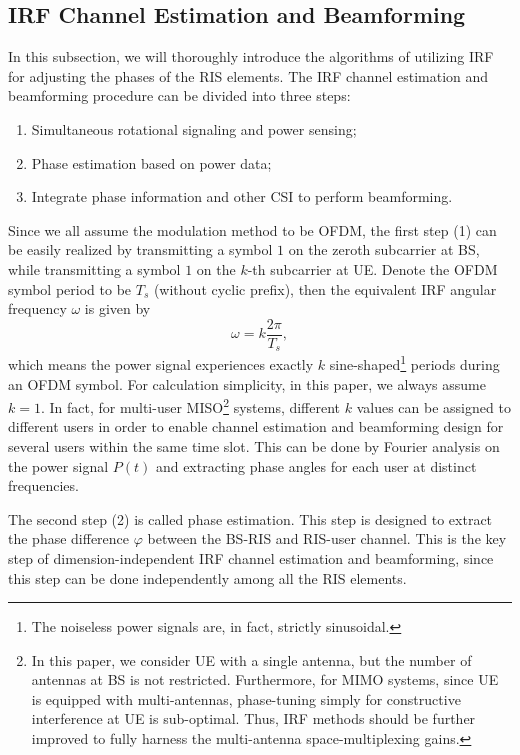 \documentclass[12pt,draftclsnofoot,journal,onecolumn]{IEEEtran}
\theoremstyle{nonumberplain}
\begin{document}
\subsection{IRF Channel Estimation and Beamforming} \label{IRF Channel Estimation and Beamforming}
    In this subsection, we will thoroughly introduce the algorithms of utilizing \ac{IRF} for adjusting the phases of the RIS elements. The \ac{IRF} channel estimation and beamforming procedure can be divided into three steps:
    \begin{enumerate}
        \item Simultaneous rotational signaling and power sensing; 
        \item Phase estimation based on power data;
        \item Integrate phase information and other CSI to perform beamforming. 
    \end{enumerate} 
    Since we all assume the modulation method to be OFDM, the first step (1) can be easily realized by transmitting a symbol $1$ on the zeroth subcarrier at BS, while transmitting a symbol $1$ on the $k$-th subcarrier at UE. 
    Denote the OFDM symbol period to be $T_s$ (without cyclic prefix), then the equivalent IRF angular frequency $\omega$ is given by 
    \begin{equation}
        \omega = k \frac{2\pi}{T_s},
    \end{equation}
    which means the power signal experiences exactly $k$ sine-shaped\footnote{The noiseless power signals are, in fact, strictly sinusoidal. } periods during an OFDM symbol. For calculation simplicity, in this paper, we always assume $k=1$. In fact, for multi-user MISO\footnote{In this paper, we consider UE with a single antenna, but the number of antennas at BS is not restricted. Furthermore, for MIMO systems, since UE is equipped with multi-antennas, phase-tuning simply for constructive interference at UE is sub-optimal. Thus, IRF methods should be further improved to fully harness the multi-antenna space-multiplexing gains.} systems, different $k$ values can be assigned to different users in order to enable channel estimation and beamforming design for several users within the same time slot. 
    This can be done by Fourier analysis on the power signal $P(t)$ and extracting phase angles for each user at distinct frequencies. 

    The second step (2) is called phase estimation. This step is designed to extract the phase difference $\varphi$ between the BS-RIS and RIS-user channel. 
    This is the key step of dimension-independent IRF channel estimation and beamforming, since this step can be done independently among all the RIS elements. 
\end{document}
